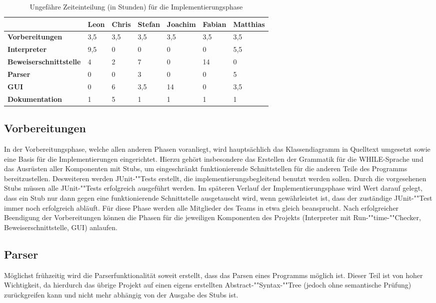 \begin{table}[H]
\caption[B]{Ungefähre Zeiteinteilung (in Stunden) für die Implementierungsphase}
\label{timeplan}
\begin{tabular}{|l|l|l|l|l|l|l|}

\hline
 & \textbf{Leon} & \textbf{Chris} & \textbf{Stefan} & \textbf{Joachim} & \textbf{Fabian} & \textbf{Matthias} \\
\hline
\textbf{Vorbereitungen} & 3,5 & 3,5 & 3,5 & 3,5 & 3,5 & 3,5 \\
\hline
\textbf{Interpreter} & 9,5 & 0 & 0 & 0 & 0 & 5,5 \\
\hline
\textbf{Beweiserschnittstelle} & 4 & 2 & 7 & 0 & 14 & 0 \\
\hline
\textbf{Parser} & 0 & 0 & 3 & 0 & 0 & 5 \\
\hline
\textbf{GUI} & 0 & 6 & 3,5 & 14 & 0 & 3,5 \\
\hline
\textbf{Dokumentation} & 1 & 5 & 1 & 1 & 1 & 1 \\
\hline
\end{tabular}
\end{table}

\subsection{Vorbereitungen}
In der Vorbereitungsphase, welche allen anderen Phasen voranliegt, wird hauptsächlich das Klassendiagramm in Quelltext umgesetzt sowie eine Basis für die Implementierungen eingerichtet. Hierzu gehört insbesondere das Erstellen der Grammatik für die WHILE-Sprache und das Ausrüsten aller Komponenten mit Stubs, um eingeschränkt funktionierende Schnittstellen für die anderen Teile des Programms bereitzustellen. Desweiteren werden JUnit-""Tests erstellt, die implementierungsbegleitend benutzt werden sollen. Durch die vorgesehenen Stubs müssen alle JUnit-""Tests erfolgreich ausgeführt werden. Im späteren Verlauf der Implementierungsphase wird Wert darauf gelegt, dass ein Stub nur dann gegen eine funktionierende Schnittstelle ausgetauscht wird, wenn gewährleistet ist, dass der zuständige JUnit-""Test immer noch erfolgreich abläuft. Für diese Phase werden alle Mitglieder des Teams in etwa gleich beansprucht. Nach erfolgreicher Beendigung der Vorbereitungen können die Phasen für die jeweiligen Komponenten des Projekts (Interpreter mit Run-""time-""Checker, Beweiserschnittstelle, GUI) anlaufen.

\subsection{Parser}
Möglichst frühzeitig wird die Parserfunktionalität soweit erstellt, dass das Parsen eines Programms möglich ist. Dieser Teil ist von hoher Wichtigkeit, da hierdurch das übrige Projekt auf einen eigens erstellten Abstract-""Syntax-""Tree (jedoch ohne semantische Prüfung) zurückgreifen kann und nicht mehr abhängig von der Ausgabe des Stubs ist.

